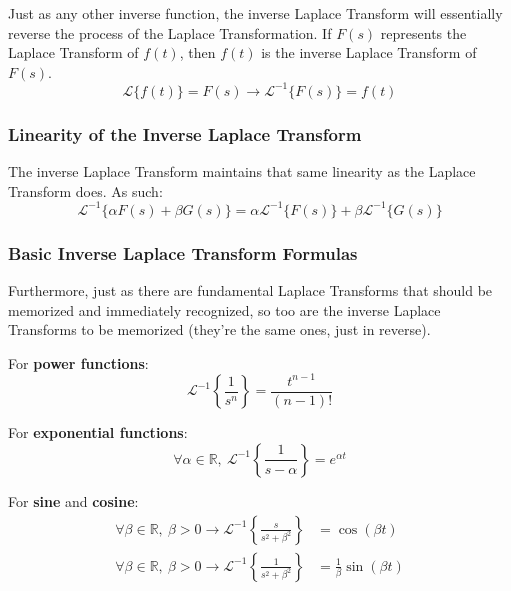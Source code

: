 \documentclass[12pt]{article}
\begin{document}
Just as any other inverse function, the inverse Laplace Transform will essentially reverse the process of the Laplace Transformation. If $F(s)$ represents the Laplace Transform of $f(t)$, then $f(t)$ is the inverse Laplace Transform of $F(s)$.
\begin{equation*}
  \mathcal{L}\big\{f(t)\big\} = F(s) \rightarrow \mathcal{L}^{-1}\big\{F(s)\big\} = f(t)
\end{equation*}

\subsubsection{Linearity of the Inverse Laplace Transform}
\label{sssec:linearityOfTheInverseLaplaceTransform}
The inverse Laplace Transform maintains that same linearity as the Laplace Transform does. As such:
\begin{equation*}
  \mathcal{L}^{-1}\big\{\alpha F(s) + \beta G(s)\big\} = \alpha \mathcal{L}^{-1}\big\{ F(s) \big\} + \beta \mathcal{L}^{-1}\big\{ G(s) \big\}
\end{equation*}

\subsubsection{Basic Inverse Laplace Transform Formulas}
\label{sssec:basicInverseLaplaceTransformFormulas}
Furthermore, just as there are fundamental Laplace Transforms that should be memorized and immediately recognized, so too are the inverse Laplace Transforms to be memorized (they're the same ones, just in reverse).

For \textbf{power functions}:
\begin{equation*}
  \mathcal{L}^{-1}\left\{\frac{1}{s^n}\right\} = \frac{t^{n-1}}{(n-1)!}
\end{equation*}

For \textbf{exponential functions}:
\begin{equation*}
  \forall \alpha \in \mathbb{R},\ \mathcal{L}^{-1}\left\{\frac{1}{s-\alpha}\right\} = e^{\alpha t}
\end{equation*}

For \textbf{sine} and \textbf{cosine}:
\begin{align*}
  \forall \beta \in \mathbb{R},\ \beta > 0 \rightarrow \mathcal{L}^{-1}\left\{\frac{s}{s^2+\beta^2}\right\} &= \cos(\beta t) \\
  \forall \beta \in \mathbb{R},\ \beta > 0 \rightarrow \mathcal{L}^{-1}\left\{\frac{1}{s^2+\beta^2}\right\} &= \frac{1}{\beta}\sin(\beta t)
\end{align*}
\end{document}

